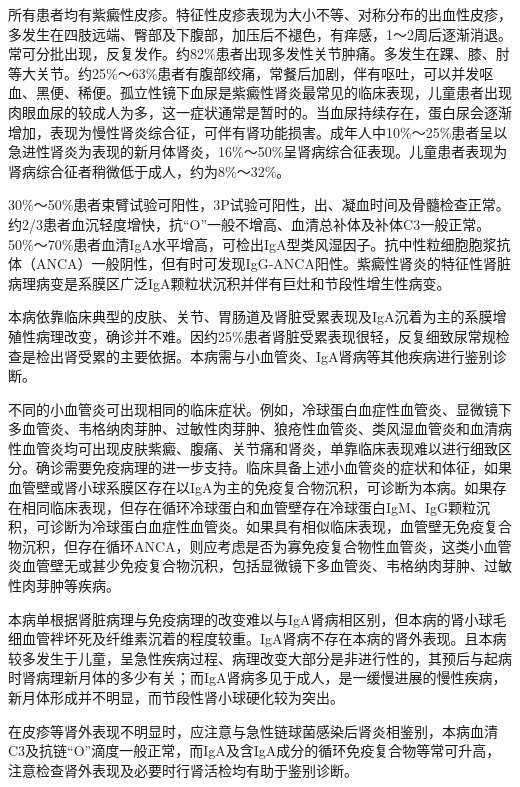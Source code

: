 所有患者均有紫癜性皮疹。特征性皮疹表现为大小不等、对称分布的出血性皮疹，多发生在四肢远端、臀部及下腹部，加压后不褪色，有痒感，1～2周后逐渐消退。常可分批出现，反复发作。约82\%患者出现多发性关节肿痛。多发生在踝、膝、肘等大关节。约25\%～63\%患者有腹部绞痛，常餐后加剧，伴有呕吐，可以并发呕血、黑便、稀便。孤立性镜下血尿是紫癜性肾炎最常见的临床表现，儿童患者出现肉眼血尿的较成人为多，这一症状通常是暂时的。当血尿持续存在，蛋白尿会逐渐增加，表现为慢性肾炎综合征，可伴有肾功能损害。成年人中10\%～25\%患者呈以急进性肾炎为表现的新月体肾炎，16\%～50\%呈肾病综合征表现。儿童患者表现为肾病综合征者稍微低于成人，约为8\%～32\%。

30\%～50\%患者束臂试验可阳性，3P试验可阳性，出、凝血时间及骨髓检查正常。约2/3患者血沉轻度增快，抗“O”一般不增高、血清总补体及补体C3一般正常。50\%～70\%患者血清IgA水平增高，可检出IgA型类风湿因子。抗中性粒细胞胞浆抗体（ANCA）一般阴性，但有时可发现IgG-ANCA阳性。紫癜性肾炎的特征性肾脏病理病变是系膜区广泛IgA颗粒状沉积并伴有巨灶和节段性增生性病变。

本病依靠临床典型的皮肤、关节、胃肠道及肾脏受累表现及IgA沉着为主的系膜增殖性病理改变，确诊并不难。因约25\%患者肾脏受累表现很轻，反复细致尿常规检查是检出肾受累的主要依据。本病需与小血管炎、IgA肾病等其他疾病进行鉴别诊断。

不同的小血管炎可出现相同的临床症状。例如，冷球蛋白血症性血管炎、显微镜下多血管炎、韦格纳肉芽肿、过敏性肉芽肿、狼疮性血管炎、类风湿血管炎和血清病性血管炎均可出现皮肤紫癜、腹痛、关节痛和肾炎，单靠临床表现难以进行细致区分。确诊需要免疫病理的进一步支持。临床具备上述小血管炎的症状和体征，如果血管壁或肾小球系膜区存在以IgA为主的免疫复合物沉积，可诊断为本病。如果存在相同临床表现，但存在循环冷球蛋白和血管壁存在冷球蛋白IgM、IgG颗粒沉积，可诊断为冷球蛋白血症性血管炎。如果具有相似临床表现，血管壁无免疫复合物沉积，但存在循环ANCA，则应考虑是否为寡免疫复合物性血管炎，这类小血管炎血管壁无或甚少免疫复合物沉积，包括显微镜下多血管炎、韦格纳肉芽肿、过敏性肉芽肿等疾病。

本病单根据肾脏病理与免疫病理的改变难以与IgA肾病相区别，但本病的肾小球毛细血管袢坏死及纤维素沉着的程度较重。IgA肾病不存在本病的肾外表现。且本病较多发生于儿童，呈急性疾病过程、病理改变大部分是非进行性的，其预后与起病时肾病理新月体的多少有关；而IgA肾病多见于成人，是一缓慢进展的慢性疾病，新月体形成并不明显，而节段性肾小球硬化较为突出。

在皮疹等肾外表现不明显时，应注意与急性链球菌感染后肾炎相鉴别，本病血清C3及抗链“O”滴度一般正常，而IgA及含IgA成分的循环免疫复合物等常可升高，注意检查肾外表现及必要时行肾活检均有助于鉴别诊断。

